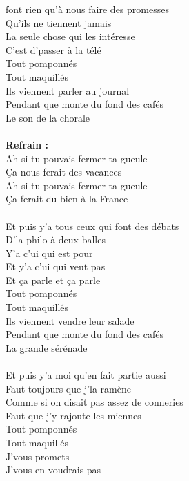 
 font rien qu'à nous faire des promesses
\\Qu'ils ne tiennent jamais
\\La seule chose qui les intéresse
\\C'est d'passer à la télé
\\Tout pomponnés
\\Tout maquillés
\\Ils viennent parler au journal
\\Pendant que monte du fond des cafés
\\Le son de la chorale
\\\\\textbf{Refrain :}
\\Ah si tu pouvais fermer ta gueule
\\Ça nous ferait des vacances
\\Ah si tu pouvais fermer ta gueule
\\Ça ferait du bien à la France
\\\\Et puis y'a tous ceux qui font des débats
\\D'la philo à deux balles
\\Y'a c'ui qui est pour
\\Et y'a c'ui qui veut pas
\\Et ça parle et ça parle
\\Tout pomponnés
\\Tout maquillés
\\Ils viennent vendre leur salade
\\Pendant que monte du fond des cafés
\\La grande sérénade
\\\\Et puis y'a moi qu'en fait partie aussi
\\Faut toujours que j'la ramène
\\Comme si on disait pas assez de conneries
\\Faut que j'y rajoute les miennes
\\Tout pomponnés
\\Tout maquillés
\\J'vous promets
\\J'vous en voudrais pas
